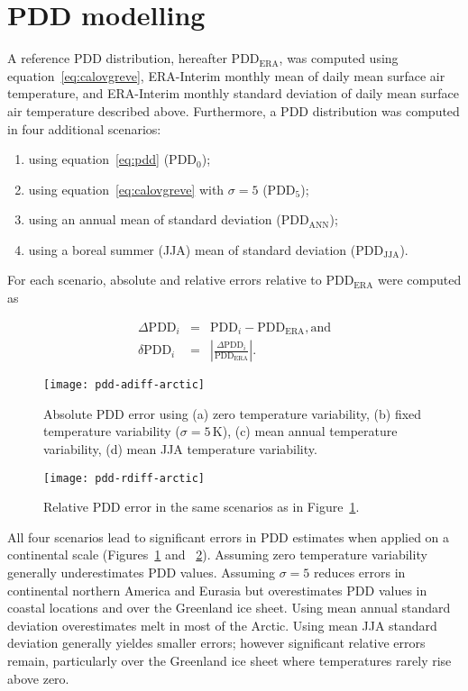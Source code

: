 \documentclass[review]{igs}
\begin{document}

\section{PDD modelling}

A reference PDD distribution, hereafter $\mathrm{PDD_{ERA}}$, was computed using equation~\ref{eq:calovgreve}, ERA-Interim monthly mean of daily mean surface air temperature, and ERA-Interim monthly standard deviation of daily mean surface air temperature described above. Furthermore, a PDD distribution was computed in four additional scenarios:

\begin{enumerate}
  \item using equation~\ref{eq:pdd} ($\mathrm{PDD_{0}}$);
  \item using equation~\ref{eq:calovgreve} with $\sigma=5$ ($\mathrm{PDD_{5}}$);
  \item using an annual mean of standard deviation ($\mathrm{PDD_{ANN}}$);
  \item using a boreal summer (JJA) mean of standard deviation ($\mathrm{PDD_{JJA}}$).
\end{enumerate}

For each scenario, absolute and relative errors relative to $\mathrm{PDD_{ERA}}$ were computed as

\begin{eqnarray}
  \Delta\mathrm{PDD}_i &=& \mathrm{PDD}_i - \mathrm{PDD_{ERA}}, \mathrm{and}\\
  \delta\mathrm{PDD}_i &=& \left|\frac{\Delta\mathrm{PDD}_i}{\mathrm{PDD_{ERA}}}\right|.
\end{eqnarray}

\begin{figure}
  \centering\texttt{[image: pdd-adiff-arctic]}
  \caption{Absolute PDD error using (a) zero temperature variability, (b) fixed temperature variability ($\sigma=5\,\mathrm{K}$), (c) mean annual temperature variability, (d) mean JJA temperature variability.}
  \label{fig:adiff}
\end{figure}

\begin{figure}
  \centering\texttt{[image: pdd-rdiff-arctic]}
  \caption{Relative PDD error in the same scenarios as in Figure~\ref{fig:adiff}.}
  \label{fig:rdiff}
\end{figure}

All four scenarios lead to significant errors in PDD estimates when applied on a continental scale (Figures~\ref{fig:adiff} and ~\ref{fig:rdiff}). Assuming zero temperature variability generally underestimates PDD values. Assuming $\sigma=5$ reduces errors in continental northern America and Eurasia but overestimates PDD values in coastal locations and over the Greenland ice sheet. Using mean annual standard deviation overestimates melt in most of the Arctic. Using mean JJA standard deviation generally yieldes smaller errors; however significant relative errors remain, particularly over the Greenland ice sheet where temperatures rarely rise above zero.
\end{document}
